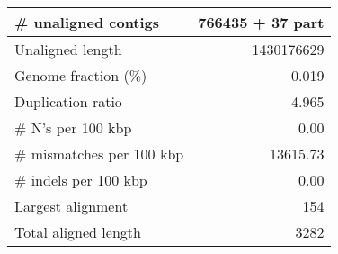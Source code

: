 \documentclass[12pt,a4paper]{article}
\begin{document}
\begin{table}[ht]
\begin{center}
\begin{tabular}{|l*{1}{|r}|}
\# unaligned contigs & 766435 + 37 part \\ \hline
Unaligned length & 1430176629 \\ \hline
Genome fraction (\%) & 0.019 \\ \hline
Duplication ratio & 4.965 \\ \hline
\# N's per 100 kbp & 0.00 \\ \hline
\# mismatches per 100 kbp & 13615.73 \\ \hline
\# indels per 100 kbp & 0.00 \\ \hline
Largest alignment & 154 \\ \hline
Total aligned length & 3282 \\ \hline
\end{tabular}
\end{center}
\end{table}
\end{document}
